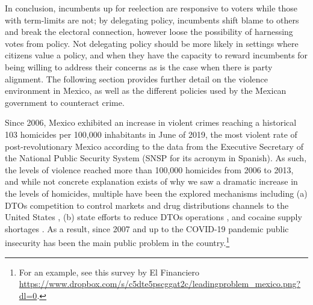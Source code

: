 \documentclass[12pt]{amsart}
\makeatletter
\def\subsection{\@startsection{subsection}{2}
	\z@{.8\linespacing\@plus.7\linespacing}{.7\linespacing}{\large}}
\numberwithin{equation}{section}
\theoremstyle{definition}
\theoremstyle{definition}
\theoremstyle{definition}
\makeatother
\begin{document}
In conclusion, incumbents up for reelection are responsive to voters while those with term-limits are not; by delegating policy, incumbents shift blame to others and break the electoral connection, however loose the possibility of harnessing votes from policy. Not delegating policy should be more likely in settings where citizens value a policy, and when they have the capacity to reward incumbents for being willing to address their concerns as is the case when there is party alignment. The following section provides further detail on the violence environment in Mexico, as well as the different policies used by the Mexican government to counteract crime. 
 
  
\subsection{Mexico's Criminal Wars \label{sec:war_drugs}}

Since 2006, Mexico exhibited an increase in violent crimes reaching a historical 103 homicides per 100,000 inhabitants in June of 2019, the most violent rate of post-revolutionary Mexico according to the data from the Executive Secretary of the National Public Security System (SNSP for its acronym in Spanish). As such, the levels of violence reached more than 100,000 homicides from 2006 to 2013, and while not concrete explanation exists of why we saw a dramatic increase in the levels of homicides, multiple have been the explored mechanisms including (a) DTOs competition to control markets and drug distributions channels to the United States \citep{rios_2013, dell_2015}, (b) state efforts to reduce DTOs operations \citep{rios_2013}, and cocaine supply shortages \citep{castillo_etal_2018}. As a result, since 2007 and up to the COVID-19 pandemic public insecurity has been the main public problem in the country.\footnote{For an example, see this survey by El Financiero \url{https://www.dropbox.com/s/c5dte5pscggat2c/leadingproblem_mexico.png?dl=0}.} 
\end{document}

